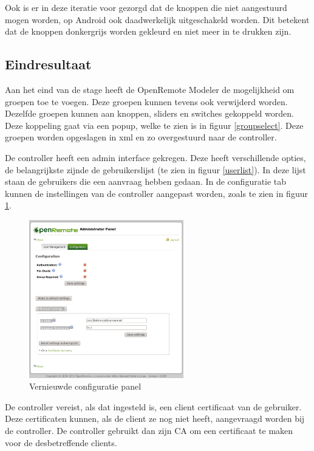 \documentclass[]{article}
\begin{document}
Ook is er in deze iteratie voor gezorgd dat de knoppen die niet aangestuurd
mogen worden, op Android ook daadwerkelijk uitgeschakeld worden. Dit betekent dat
de knoppen donkergrijs worden gekleurd en niet meer in te drukken zijn.


\subsection{Eindresultaat}
Aan het eind van de stage heeft de OpenRemote Modeler de mogelijkheid om groepen
toe te voegen. Deze groepen kunnen tevens ook verwijderd worden. Dezelfde
groepen kunnen aan knoppen, sliders en switches gekoppeld worden. Deze koppeling
gaat via een popup, welke te zien is in figuur \ref{groupselect}. Deze groepen
worden opgeslagen in xml en zo overgestuurd naar de controller.

De controller heeft een admin interface gekregen. Deze heeft verschillende
opties, de belangrijkste zijnde de gebruikerslijst (te zien in figuur
\ref{userlist}). In deze lijst staan de gebruikers die een aanvraag hebben
gedaan. In de configuratie tab kunnen de instellingen van de controller
aangepast worden, zoals te zien in figuur \ref{configv2}. 

\begin{figure}[h!]
  \centering
    \includegraphics[width=0.6\textwidth,keepaspectratio]{configv2.pdf}
  \caption{Vernieuwde configuratie panel}
  \label{configv2}
\end{figure}

De controller vereist, als dat ingesteld is, een client certificaat van de
gebruiker. Deze certificaten kunnen, als de client ze nog niet heeft,
aangevraagd worden bij de controller. De controller gebruikt dan zijn CA om een
certificaat te maken voor de desbetreffende clients. 
\end{document}
